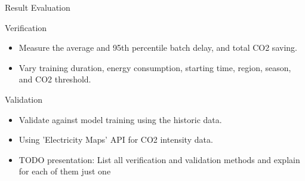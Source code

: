 \begin{frame}[t]{Result Evaluation}{}

Verification
\begin{itemize}
    \item Measure the average and 95th percentile batch delay, and total CO2 saving.
    \item Vary training duration, energy consumption, starting time, region, season, and CO2 threshold.
\end{itemize}

Validation
\begin{itemize}
    \item Validate against model training using the historic data.
    \item Using 'Electricity Maps' API for CO2 intensity data.
\end{itemize}

\begin{itemize}
    \item TODO presentation: List all verification and validation methods and explain for each of them just one
\end{itemize}

\end{frame}
